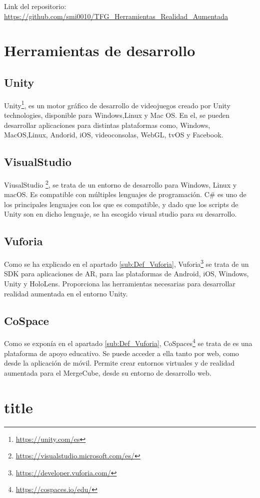  Link del repositorio: \url{https://github.com/smi0010/TFG_Herramientas_Realidad_Aumentada}

\section{Herramientas de desarrollo}
\subsection{Unity}
Unity\footnote{\url{https://unity.com/es}}, es un motor gráfico de desarrollo de videojuegos creado por Unity technologies, disponible para Windows,Linux y Mac OS. En el, se pueden desarrollar aplicaciones para distintas plataformas como, Windows, MacOS,Linux, Andorid, iOS, videoconsolas, WebGL, tvOS y Facebook.
\subsection{VisualStudio}
ViusalStudio \footnote{\url{https://visualstudio.microsoft.com/es/}}, se trata de un entorno de desarrollo para Windows, Linux y macOS. Es compatible con múltiples lenguajes de programación. C\# es uno de los principales lenguajes con los que es compatible, y dado que los scripts de Unity son en dicho lenguaje, se ha escogido visual studio para su desarrollo.

\subsection{Vuforia}
Como se ha explicado en el apartado \ref{sub:Def_Vuforia}, Vuforia\footnote{\url{https://developer.vuforia.com/}} se trata de un SDK para aplicaciones de AR, para las plataformas de Android, iOS, Windows, Unity y HoloLens. Proporciona las herramientas necesarias para desarrollar realidad aumentada en el entorno Unity.
\subsection{CoSpace}
Como se exponía en el apartado \ref{sub:Def_Vuforia}, CoSpaces\footnote{\url{https://cospaces.io/edu/}} se trata de  es una plataforma de apoyo educativo. Se puede acceder a ella tanto por web, como desde la aplicación de móvil. Permite crear entornos virtuales y de realidad aumentada para el MergeCube, desde su entorno de desarrollo web.

\section{title}
